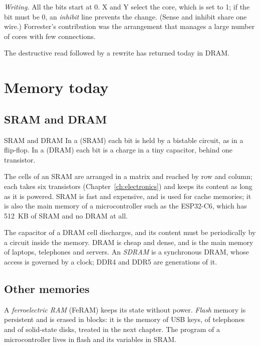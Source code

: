\emph{Writing.} All the bits start at 0. X and Y select the core, which is
set to 1; if the bit must be 0, an \emph{inhibit} line prevents the change.
(Sense and inhibit share one wire.) Forrester's contribution was the
arrangement that manages a large number of cores with few connections.

The destructive read followed by a rewrite has returned today in DRAM.

\section{Memory today}

\subsection{SRAM and DRAM}

\begin{definition}{SRAM and DRAM}
In a  (SRAM) each bit is held by a bistable circuit, as in a
flip-flop. In a  (DRAM) each bit is a charge in a tiny
capacitor, behind one transistor.
\end{definition}

The cells of an SRAM are arranged in a matrix and reached by row and column;
each takes six transistors (Chapter~\ref{ch:electronics}) and keeps its
content as long as it is powered. SRAM is fast and expensive, and is used for
cache memories; it is also the main memory of a microcontroller such as the
ESP32-C6, which has 512~KB of SRAM and no DRAM at all.

The capacitor of a DRAM cell discharges, and its content must be
 periodically by a circuit inside the memory. DRAM is cheap
and dense, and is the main memory of laptops, telephones and servers. An
\emph{SDRAM} is a synchronous DRAM, whose access is governed by a clock; DDR4
and DDR5 are generations of it.

\subsection{Other memories}

A \emph{ferroelectric RAM} (FeRAM) keeps its state without power.
\emph{Flash} memory is persistent and is erased in blocks: it is the memory of
USB keys, of telephones and of solid-state disks, treated in the next chapter.
The program of a microcontroller lives in flash and its variables in SRAM.

